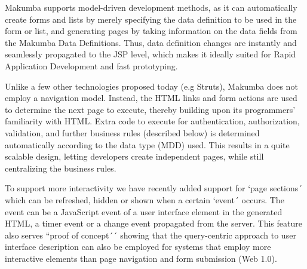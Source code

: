 \documentclass{chi2009}
\begin{document}
Makumba supports model-driven development methods, as it can automatically create forms and lists by merely specifying the data definition to be used in the form or list, and generating pages by taking information on the data fields from the Makumba Data Definitions.%
Thus, data definition changes are instantly and seamlessly propagated to the JSP level, which makes it ideally suited for Rapid Application Development and fast prototyping. %

Unlike a few other technologies proposed today (e.g Struts), Makumba does not employ a navigation model. Instead, the HTML links and form actions are used to determine the next page to execute, thereby building upon its programmers' familiarity with HTML. Extra code to execute for authentication, authorization, validation, and further business rules (described below) is determined automatically according to the data type (MDD) used. This results in a quite scalable design, letting developers create independent pages, while still centralizing the business rules. %

To support more interactivity we have recently added support for `page sections´ which can be refreshed, hidden or shown when a certain `event´ occurs. The event can be a JavaScript event of a user interface element in the generated HTML, a timer event or a change event propagated from the server. This feature also serves ``proof of concept´´ showing that the query-centric approach to user interface description can also be employed for systems that employ more interactive elements than page navigation and form submission (Web 1.0).
\end{document}
